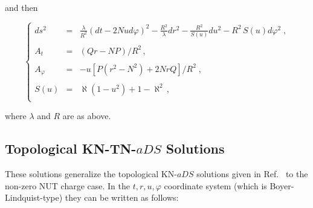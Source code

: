\documentclass[12pt,a4paper]{article}
\begin{document}
\noindent and then 

\begin{equation}
\left\{
\begin{array}{rcl}
ds^{2} & = & 
{\displaystyle\frac{\lambda}{R^{2}}}
\left(dt -2Nud\varphi\right)^{2} 
-{\displaystyle\frac{R^{2}}{\lambda}}dr^{2}
-{\displaystyle\frac{R^{2}}{S(u)}}du^{2} -R^{2}\, S(u)d\varphi^{2} \; ,\\
& & \\
A_{t} & = & \left( Qr-NP\right) /R^{2}\, ,\\
& & \\
A_{\varphi} & = & 
-u \left[ P\left( r^{2}-N^{2}\right)+ 2NrQ \right]/R^{2} \; ,\\
& & \\
S(u) & = &  \aleph (1-u^{2})+1-\aleph^{2}\, ,\\
\end{array}
\right.
\end{equation}

\noindent where $\lambda$ and $R$ are as above.


\subsection{Topological KN-TN-$aDS$ Solutions}

These solutions generalize the topological KN-$aDS$ solutions given in
Ref.~\cite{art:KMV,art:CK} to the non-zero NUT charge case.  In the
$t,r,u,\varphi$ coordinate system (which is Boyer-Lindquist-type) they
can be written as follows:
\end{document}

